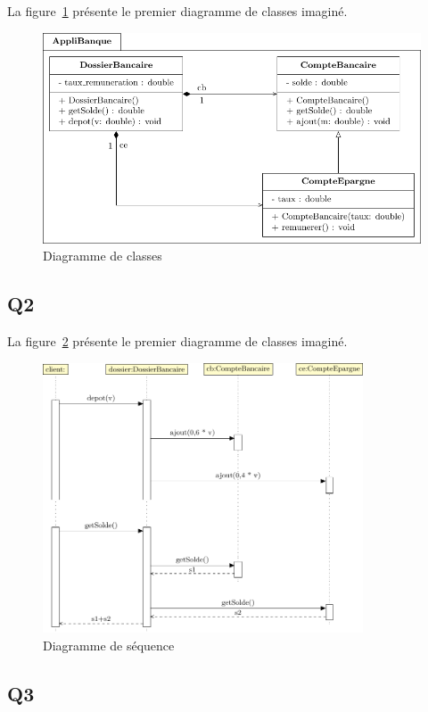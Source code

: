 \documentclass[12pt]{article}
\begin{document}
La figure~\ref{UC1} présente le premier diagramme de classes imaginé. 

\begin{figure}[h]
    \centering
    \includegraphics{Diagrammes/UML_UC1.pdf}
    \caption{Diagramme de classes\label{UC1}}
\end{figure}

\newpage 


\subsection{Q2}

La figure~\ref{US1} présente le premier diagramme de classes imaginé. 
\begin{figure}[h]
    \centering
    \includegraphics[height=8cm]{Diagrammes/UML_US1.pdf}
    \caption{Diagramme de séquence\label{US1}}
\end{figure}


\subsection{Q3}
\end{document}
